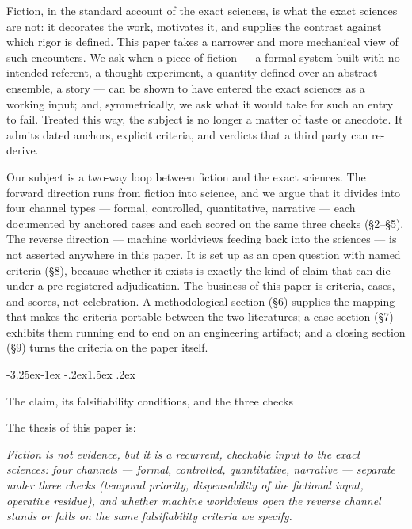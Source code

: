 \documentclass[11pt,a4paper]{article}
\makeatletter
\renewcommand\subsection{\@startsection{subsection}{2}{\z@}%
  {-3.25ex\@plus -1ex \@minus -.2ex}{1.5ex \@plus .2ex}%
  {\normalfont\large\bfseries\raggedright}}
\makeatother
\begin{document}
Fiction, in the standard account of the exact sciences, is what the exact sciences are not: it decorates the work, motivates it, and supplies the contrast against which rigor is defined. This paper takes a narrower and more mechanical view of such encounters. We ask when a piece of fiction — a formal system built with no intended referent, a thought experiment, a quantity defined over an abstract ensemble, a story — can be shown to have entered the exact sciences as a working input; and, symmetrically, we ask what it would take for such an entry to fail. Treated this way, the subject is no longer a matter of taste or anecdote. It admits dated anchors, explicit criteria, and verdicts that a third party can re-derive.

Our subject is a two-way loop between fiction and the exact sciences. The forward direction runs from fiction into science, and we argue that it divides into four channel types — formal, controlled, quantitative, narrative — each documented by anchored cases and each scored on the same three checks (§2–§5). The reverse direction — machine worldviews feeding back into the sciences — is not asserted anywhere in this paper. It is set up as an open question with named criteria (§8), because whether it exists is exactly the kind of claim that can die under a pre-registered adjudication. The business of this paper is criteria, cases, and scores, not celebration. A methodological section (§6) supplies the mapping that makes the criteria portable between the two literatures; a case section (§7) exhibits them running end to end on an engineering artifact; and a closing section (§9) turns the criteria on the paper itself.

\subsection{The claim, its falsifiability conditions, and the three checks}

The thesis of this paper is:

\textit{Fiction is not evidence, but it is a recurrent, checkable input to the exact sciences: four channels — formal, controlled, quantitative, narrative — separate under three checks (temporal priority, dispensability of the fictional input, operative residue), and whether machine worldviews open the reverse channel stands or falls on the same falsifiability criteria we specify.}
\end{document}
